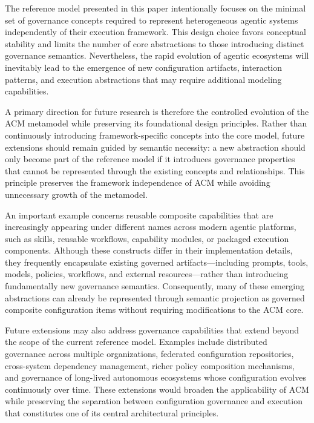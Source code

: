 \documentclass[10pt]{article}
\begin{document}
The reference model presented in this paper intentionally focuses on the minimal set of governance concepts required to represent heterogeneous agentic systems independently of their execution framework. This design choice favors conceptual stability and limits the number of core abstractions to those introducing distinct governance semantics. Nevertheless, the rapid evolution of agentic ecosystems will inevitably lead to the emergence of new configuration artifacts, interaction patterns, and execution abstractions that may require additional modeling capabilities.

A primary direction for future research is therefore the controlled evolution of the ACM metamodel while preserving its foundational design principles. Rather than continuously introducing framework-specific concepts into the core model, future extensions should remain guided by semantic necessity: a new abstraction should only become part of the reference model if it introduces governance properties that cannot be represented through the existing concepts and relationships. This principle preserves the framework independence of ACM while avoiding unnecessary growth of the metamodel.

An important example concerns reusable composite capabilities that are increasingly appearing under different names across modern agentic platforms, such as skills, reusable workflows, capability modules, or packaged execution components. Although these constructs differ in their implementation details, they frequently encapsulate existing governed artifacts—including prompts, tools, models, policies, workflows, and external resources—rather than introducing fundamentally new governance semantics. Consequently, many of these emerging abstractions can already be represented through semantic projection as governed composite configuration items without requiring modifications to the ACM core.

Future extensions may also address governance capabilities that extend beyond the scope of the current reference model. Examples include distributed governance across multiple organizations, federated configuration repositories, cross-system dependency management, richer policy composition mechanisms, and governance of long-lived autonomous ecosystems whose configuration evolves continuously over time. These extensions would broaden the applicability of ACM while preserving the separation between configuration governance and execution that constitutes one of its central architectural principles.
\end{document}
